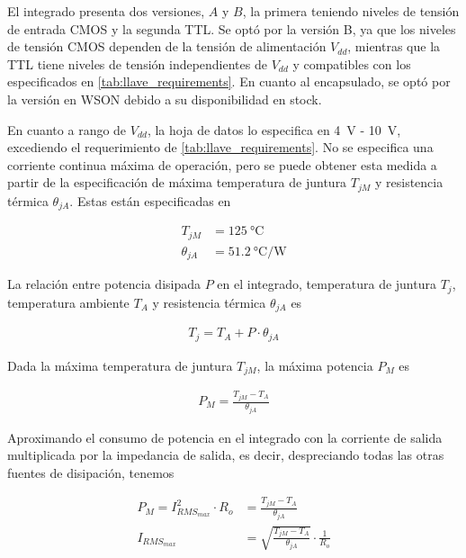 El integrado presenta dos versiones, $A$ y $B$, la primera teniendo niveles de
tensión de entrada CMOS y la segunda TTL.  Se optó por la versión B, ya que los
niveles de tensión CMOS dependen de la tensión de alimentación $V_{dd}$,
mientras que la TTL tiene niveles de tensión independientes de $V_{dd}$ y
compatibles con los especificados en \ref{tab:llave_requirements}. En cuanto al
encapsulado, se optó por la versión en WSON debido a su disponibilidad en
stock.

En cuanto a rango de $V_{dd}$, la hoja de datos lo especifica en \qty{4}{\volt}
- \qty{10}{\volt}, excediendo el requerimiento de \ref{tab:llave_requirements}.
No se especifica una corriente continua máxima de operación, pero se puede
obtener esta medida a partir de la especificación de máxima temperatura de
juntura $T_{jM}$ y resistencia térmica $\theta_{jA}$. Estas están especificadas en

\begin{equation}
    \begin{aligned}
        T_{jM} & = \qty{125}{\celsius} \\
        \theta_{jA} &= \qty[per-mode=fraction]{51.2}{\celsius\per\watt}
    \end{aligned}
\end{equation}

La relación entre potencia disipada $P$ en el integrado, temperatura de juntura
$T_j$, temperatura ambiente $T_A$ y resistencia térmica $\theta_{jA}$ es

\begin{equation}
    \begin{aligned}
        T_{j} = T_{A} + P \cdot \theta_{jA}
    \end{aligned}
\end{equation}

Dada la máxima temperatura de juntura $T_{jM}$, la máxima potencia $P_M$ es

\begin{equation}
    \begin{aligned}
        P_{M} = \frac{T_{jM}-T_A}{\theta_{jA}}
    \end{aligned}
\end{equation}

Aproximando el consumo de potencia en el integrado con la corriente de salida
multiplicada por la impedancia de salida, es decir, despreciando todas las otras
fuentes de disipación, tenemos

\begin{equation}
    \begin{aligned}
        P_{M} = I_{RMS_{max}}^2 \cdot R_o &= \frac{T_{jM}-T_A}{\theta_{jA}} \\
        I_{RMS_{max}} &= \sqrt{\frac{T_{jM}-T_A}{\theta_{jA}}} \cdot \frac{1}{R_o} \\
    \end{aligned}
\end{equation}

